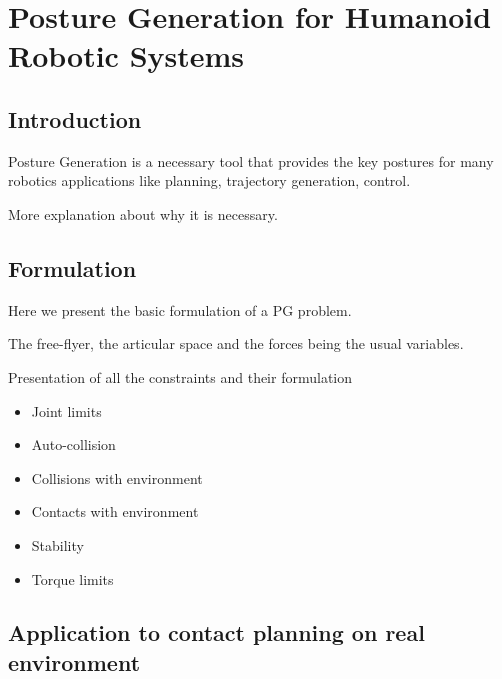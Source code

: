 \chapter{
Posture Generation for Humanoid Robotic Systems
}

\label{chapter:PG}

\ifpdf
    \graphicspath{{Chapter2/Figs/Raster/}{Chapter2/Figs/PDF/}{Chapter2/Figs/}}
\else
    \graphicspath{{Chapter2/Figs/Vector/}{Chapter2/Figs/}}
\fi



\section{Introduction}

Posture Generation is a necessary tool that provides the key postures for many robotics applications like planning, trajectory generation, control.

More explanation about why it is necessary.


\section{Formulation}

Here we present the basic formulation of a PG problem.

The free-flyer, the articular space and the forces being the usual variables.

Presentation of all the constraints and their formulation
\begin{itemize}
  \item Joint limits
  \item Auto-collision
  \item Collisions with environment
  \item Contacts with environment
  \item Stability
  \item Torque limits
\end{itemize}


\section{Application to contact planning on real environment}
